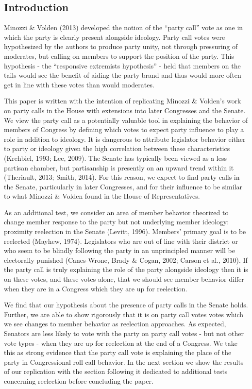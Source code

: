 \documentclass[12pt]{article}
\begin{document}
\subsection{Introduction}

Minozzi \& Volden (2013) developed the notion of the ``party call'' vote as one in which the party is clearly present alongside ideology. Party call votes were hypothesized by the authors to produce party unity, not through pressuring of moderates, but calling on members to support the position of the party. This hypothesis - the ``responsive extremists hypothesis'' - held that members on the tails would see the benefit of aiding the party brand and thus would more often get in line with these votes than would moderates.

This paper is written with the intention of replicating Minozzi \& Volden's work on party calls in the House with extensions into later Congresses and the Senate. We view the party call as a potentially valuable tool in explaining the behavior of members of Congress by defining which votes to expect party influence to play a role in addition to ideology. It is dangerous to attribute legislator behavior either to party or ideology given the high correlation between these characteristics (Krehbiel, 1993; Lee, 2009). The Senate has typically been viewed as a less partisan chamber, but partisanship is presently on an upward trend within it (Theriault, 2013; Smith, 2014). For this reason, we expect to find party calls in the Senate, particularly in later Congresses, and for their influence to be similar to what Minozzi \& Volden found in the House of Representatives.

As an additional test, we consider an area of member behavior theorized to change member response to the party but not underlying member ideology: proximity reelection in the Senate (Levitt, 1996). Members' primary goal is to be reelected (Mayhew, 1974). Legislators who are out of line with their district or who seem to be blindly following the party in an unprincipled manner will be electorally punished (Canes-Wrone, Brady \& Cogan, 2002; Carson et al., 2010). If the party call is truly explaining the role of the party alongside ideology then it is on these votes, and these votes alone, that we should see member behavior differ when they are in a Congress which they are up for reelection. 

We find that our hypothesis about the presence of party calls in the Senate holds. Further, we are able to show rigorously that it is on party call votes votes which we see changes to member behavior as reelection approaches. As expected, Senators are less likely to vote with the party on party call votes - but not other vote types - when they are up for reelection at the end of a Congress. We take this as strong evidence that the party call vote is explaining the place of the party in Congressional roll call behavior. In the next section we show the results of our replication with the section following it dedicated to additional tests concerning reelection before concluding the paper.
\end{document}
